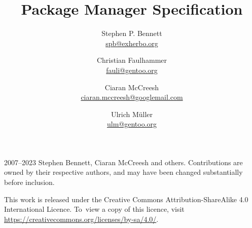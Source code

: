 \documentclass{pms}
\title{Package Manager Specification}
\author{%
    Stephen P. Bennett \\
    \href{mailto:spb@exherbo.org}{spb@exherbo.org}
    \and
    Christian Faulhammer \\
    \href{mailto:fauli@gentoo.org}{fauli@gentoo.org}
    \and
    Ciaran McCreesh \\
    \href{mailto:ciaran.mccreesh@googlemail.com}{ciaran.mccreesh@googlemail.com}
    \and
    Ulrich Müller \\
    \href{mailto:ulm@gentoo.org}{ulm@gentoo.org}
}
\begin{document}
\maketitle

\thispagestyle{empty}
\vspace*{\fill}
{%
    \small
    \textcopyright{} 2007--2023 Stephen Bennett, Ciaran McCreesh and others. Contributions are owned
    by their respective authors, and may have been changed substantially before inclusion.

    This work is released under the Creative Commons Attribution-ShareAlike 4.0 International
    Licence. To~view a copy of this licence, visit
    \url{https://creativecommons.org/licenses/by-sa/4.0/}.

    \commitinfo
}

\tableofcontents
\listofalgorithms
\listoflistings
\listoftables



















\appendix



\end{document}

